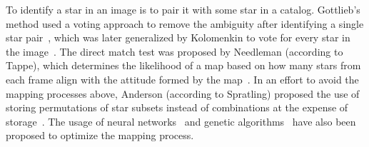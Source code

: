 To identify a star in an image is to pair it with some star in a catalog.
Gottlieb's method used a voting approach to remove the ambiguity after identifying a single star
pair~\cite{gottlieb:spacecraftAttitudeDetermination},
which was later generalized by Kolomenkin to vote for every star in the image~\cite{kolomenkin:geometricVoting}.
The direct match test was proposed by Needleman (according to Tappe), which determines the likelihood of a map based
on how many stars from each frame align with the attitude formed by the map~\cite{needelman:stellarAttitudeAcquisition}.
In an effort to avoid the mapping processes above, Anderson (according to Spratling) proposed the use of storing
permutations of star subsets instead of combinations at the expense of storage~\cite{anderson:autonomousStarSensing}.
The usage of neural networks~\cite{lindsey:neuralNetworkMethods,alvelda:neuralNetworkStar} and genetic
algorithms~\cite{paladugu:geneticAlgorithms} have also been proposed to optimize the mapping process.
